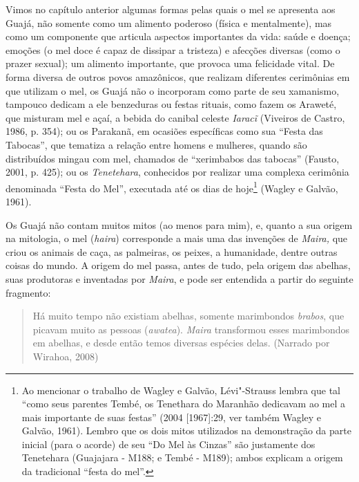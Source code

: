 Vimos no capítulo anterior algumas formas pelas quais o mel se apresenta
aos Guajá, não somente como um alimento poderoso (física e mentalmente),
mas como um componente que articula aspectos importantes da vida: saúde
e doença; emoções (o mel doce é capaz de dissipar a tristeza) e afecções
diversas (como o prazer sexual); um alimento importante, que provoca uma
felicidade vital. De forma diversa de outros povos amazônicos, que
realizam diferentes cerimônias em que utilizam o mel, os Guajá não o
incorporam como parte de seu xamanismo, tampouco dedicam a ele
benzeduras ou festas rituais, como fazem os Araweté, que misturam mel e
açaí, a bebida do canibal celeste \emph{Iaracĩ} (Viveiros de Castro,
1986, p. 354); ou os Parakanã, em ocasiões específicas como sua ``Festa
das Tabocas'', que tematiza a relação entre homens e mulheres, quando são
distribuídos mingau com mel, chamados de ``xerimbabos das tabocas''
(Fausto, 2001, p. 425); ou os \emph{Tenetehara}, conhecidos por realizar
uma complexa cerimônia denominada ``Festa do Mel'', executada até os dias
de hoje\footnote{Ao mencionar o trabalho de Wagley e Galvão,
  Lévi"-Strauss lembra que tal ``como seus parentes Tembé, os Tenethara do
  Maranhão dedicavam ao mel a mais importante de suas festas'' (2004
  {[}1967{]}:29, ver também Wagley e Galvão, 1961). Lembro que os dois
  mitos utilizados na demonstração da parte inicial (para o acorde) de
  seu ``Do Mel às Cinzas'' são justamente dos Tenetehara (Guajajara -
  M188; e Tembé - M189); ambos explicam a origem da tradicional ``festa
  do mel''.} (Wagley e Galvão, 1961).

Os Guajá não contam muitos mitos (ao menos para mim), e, quanto a sua
origem na mitologia, o mel (\emph{haira}) corresponde a mais uma das
invenções de \emph{Maira,} que criou os animais de caça, as palmeiras,
os peixes, a humanidade, dentre outras coisas do mundo. A origem do mel
passa, antes de tudo, pela origem das abelhas, suas produtoras e
inventadas por \emph{Maira}, e pode ser entendida a partir do seguinte
fragmento:

\begin{quote}
Há muito tempo não existiam abelhas, somente marimbondos \emph{brabos},
que picavam muito as pessoas (\emph{awatea}). \emph{Maira} transformou
esses marimbondos em abelhas, e desde então temos diversas espécies
delas. (Narrado por Wirahoa, 2008)
\end{quote}

